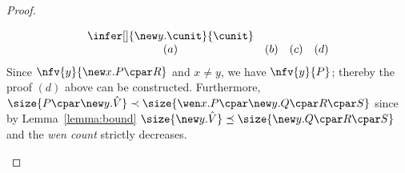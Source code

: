\documentclass[UKenglish,acmsmall,authorversion]{acmart}
\theoremstyle{plain}
\begin{document}
{\begin{proof}
\begin{enumerate}[label=\textbf{\Alph*},ref=\Alph*,leftmargin=*]
\begin{enumerate}[label*=\textbf{.\arabic*}]
\[\begin{array}{cccc}
{{}{
\infer[]{
 \new y. \cunit
}{
 \cunit
}}}\\
(a) & (b) & (c) & (d)
\end{array}
\]
Since $\nfv{y}{\new x. P \cpar R}$ and $x \not= y$, we have $\nfv{y}{P}$;
thereby the proof $(d)$ above can be constructed.
Furthermore, $\size{ P \cpar \new y. \hat{V} } \prec \size{ \wen x. P \cpar \new y. Q \cpar R \cpar S }$ since by Lemma~\ref{lemma:bound} $\size{ \new y. \hat{V} } \preceq \size{\new y. Q \cpar R \cpar S}$
and the \textit{wen count} strictly decreases.



\end{enumerate}
\end{enumerate}
\end{proof}}
\end{document}
